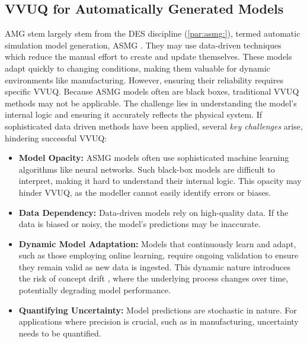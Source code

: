 \subsection{VVUQ for Automatically Generated Models}
\label{sec:requirements-automatically-generated-models}
AMG stem largely stem from the DES discipline (\autoref{par:asmg:}), termed automatic simulation model generation, ASMG \autocite{mildeautomated,Charpentier2014}. They may use data-driven techniques which reduce the manual effort to create and update themselves. These models adapt quickly to changing conditions, making them valuable for dynamic environments like manufacturing. However, ensuring their reliability requires specific VVUQ. Because ASMG models often are black boxes, traditional VVUQ methods may not be applicable. The challenge lies in understanding the model's internal logic and ensuring it accurately reflects the physical system. If sophisticated data driven methods have been applied, several \textit{key challenges} arise, hindering successful VVUQ:

\begin{itemize}
  \item \textbf{Model Opacity:} ASMG models often use sophisticated machine learning algorithms like neural networks. Such black-box models are difficult to interpret, making it hard to understand their internal logic. This opacity may hinder VVUQ, as the modeller cannot easily identify errors or biases.
  \item \textbf{Data Dependency:} Data-driven models rely on high-quality data. If the data is biased or noisy, the model's predictions may be inaccurate.
  \item \textbf{Dynamic Model Adaptation:} Models that continuously learn and adapt, such as those employing online learning, require ongoing validation to ensure they remain valid as new data is ingested. This dynamic nature introduces the risk of concept drift \autocite{lu2018learning}, where the underlying process changes over time, potentially degrading model performance.
  \item \textbf{Quantifying Uncertainty:} Model predictions are stochastic in nature. For applications where precision is crucial, such as in manufacturing, uncertainty needs to be quantified.
\end{itemize}

